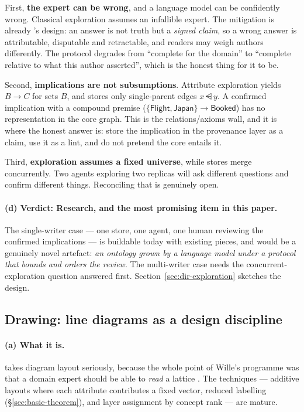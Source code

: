 First, \textbf{the expert can be wrong}, and a language model can be
confidently wrong. Classical exploration assumes an infallible expert. The
mitigation is already \odag{}'s design: an answer is not truth but a
\emph{signed claim}, so a wrong answer is attributable, disputable and
retractable, and readers may weigh authors differently. The protocol degrades
from ``complete for the domain'' to ``complete relative to what this author
asserted'', which is the honest thing for it to be.

Second, \textbf{implications are not subsumptions}. Attribute exploration
yields $B \to C$ for sets $B$, and \odag{} stores only single-parent edges
$x \dsub y$. A confirmed implication with a compound premise
($\{\textsf{Flight}, \textsf{Japan}\} \to \textsf{Booked}$) has no
representation in the core graph. This is the relations/axioms wall, and it is
where the honest answer is: store the implication in the provenance layer as a
claim, use it as a lint, and do not pretend the core entails it.

Third, \textbf{exploration assumes a fixed universe}, while \odag{} stores
merge concurrently. Two agents exploring two replicas will ask different
questions and confirm different things. Reconciling that is genuinely open.

\paragraph{(d) Verdict: \textbf{Research}, and the most promising item in this
paper.} The single-writer case --- one store, one agent, one human reviewing
the confirmed implications --- is buildable today with existing pieces, and
would be a genuinely novel artefact: \emph{an ontology grown by a language
model under a protocol that bounds and orders the review}. The multi-writer
case needs the concurrent-exploration question answered first.
Section~\ref{sec:dir-exploration} sketches the design.

\subsection{Drawing: line diagrams as a design discipline}
\label{sec:learn-drawing}

\paragraph{(a) What it is.} \fca{} takes diagram layout seriously, because the
whole point of Wille's programme was that a domain expert should be able to
\emph{read} a lattice \citep{wille1982}. The techniques --- additive layouts
where each attribute contributes a fixed vector, reduced labelling
(\S\ref{sec:basic-theorem}), and layer assignment by concept rank --- are
mature.

